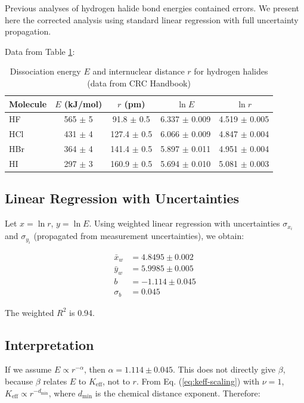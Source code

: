 \documentclass[12pt,a4paper]{article}
\theoremstyle{remark}
\newcommand{\Keff}{K_{\mathrm{eff}}}
\begin{document}
	Previous analyses of hydrogen halide bond energies contained errors. We present here the corrected analysis using standard linear regression with full uncertainty propagation.
	
	Data from Table \ref{tab:HX}:
	
	\begin{table}[htbp]
		\centering
		\caption{Dissociation energy $E$ and internuclear distance $r$ for hydrogen halides (data from CRC Handbook)}
		\label{tab:HX}
		\begin{tabular}{lcccc}
			\toprule
			Molecule & $E$ (kJ/mol) & $r$ (pm) & $\ln E$ & $\ln r$ \\
			\midrule
			HF & 565 $\pm$ 5 & 91.8 $\pm$ 0.5 & 6.337 $\pm$ 0.009 & 4.519 $\pm$ 0.005 \\
			HCl & 431 $\pm$ 4 & 127.4 $\pm$ 0.5 & 6.066 $\pm$ 0.009 & 4.847 $\pm$ 0.004 \\
			HBr & 364 $\pm$ 4 & 141.4 $\pm$ 0.5 & 5.897 $\pm$ 0.011 & 4.951 $\pm$ 0.004 \\
			HI  & 297 $\pm$ 3 & 160.9 $\pm$ 0.5 & 5.694 $\pm$ 0.010 & 5.081 $\pm$ 0.003 \\
			\bottomrule
		\end{tabular}
	\end{table}
	
	\subsection{Linear Regression with Uncertainties}
	
	Let $x = \ln r$, $y = \ln E$. Using weighted linear regression with uncertainties $\sigma_{x_i}$ and $\sigma_{y_i}$ (propagated from measurement uncertainties), we obtain:
	
	\begin{align}
		\bar{x}_w &= 4.8495 \pm 0.002 \\
		\bar{y}_w &= 5.9985 \pm 0.005 \\
		b &= -1.114 \pm 0.045 \\
		\sigma_b &= 0.045
	\end{align}
	
	The weighted $R^2$ is 0.94.
	
	\subsection{Interpretation}
	
	If we assume $E \propto r^{-\alpha}$, then $\alpha = 1.114 \pm 0.045$. This does not directly give $\beta$, because $\beta$ relates $E$ to $\Keff$, not to $r$. From Eq. (\ref{eq:keff-scaling}) with $\nu = 1$, $\Keff \propto r^{-d_{\text{min}}}$, where $d_{\text{min}}$ is the chemical distance exponent. Therefore:
	
\end{document}
